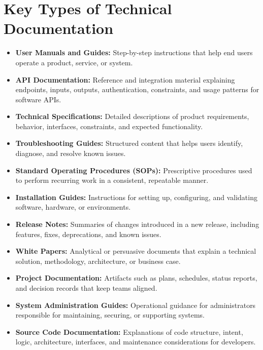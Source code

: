 \documentclass[11pt]{article}
\begin{document}
\section{Key Types of Technical Documentation}
\begin{itemize}
  \item \textbf{User Manuals and Guides:} Step-by-step instructions that help end users operate a product, service, or system.
  \item \textbf{API Documentation:} Reference and integration material explaining endpoints, inputs, outputs, authentication, constraints, and usage patterns for software APIs.
  \item \textbf{Technical Specifications:} Detailed descriptions of product requirements, behavior, interfaces, constraints, and expected functionality.
  \item \textbf{Troubleshooting Guides:} Structured content that helps users identify, diagnose, and resolve known issues.
  \item \textbf{Standard Operating Procedures (SOPs):} Prescriptive procedures used to perform recurring work in a consistent, repeatable manner.
  \item \textbf{Installation Guides:} Instructions for setting up, configuring, and validating software, hardware, or environments.
  \item \textbf{Release Notes:} Summaries of changes introduced in a new release, including features, fixes, deprecations, and known issues.
  \item \textbf{White Papers:} Analytical or persuasive documents that explain a technical solution, methodology, architecture, or business case.
  \item \textbf{Project Documentation:} Artifacts such as plans, schedules, status reports, and decision records that keep teams aligned.
  \item \textbf{System Administration Guides:} Operational guidance for administrators responsible for maintaining, securing, or supporting systems.
  \item \textbf{Source Code Documentation:} Explanations of code structure, intent, logic, architecture, interfaces, and maintenance considerations for developers.
\end{itemize}
\end{document}
